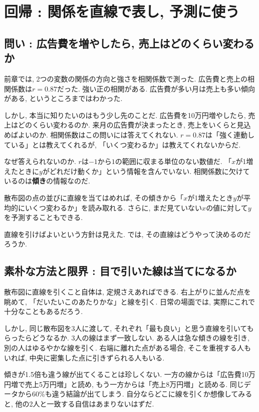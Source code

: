 ﻿\section{回帰 : 関係を直線で表し, 予測に使う}

\subsection{問い : 広告費を増やしたら, 売上はどのくらい変わるか}

前章では, 2つの変数の関係の方向と強さを相関係数で測った.
広告費と売上の相関係数は$r = 0.87$だった.
強い正の相関がある. 広告費が多い月は売上も多い傾向がある, というところまではわかった.

しかし, 本当に知りたいのはもう少し先のことだ.
広告費を10万円増やしたら, 売上はどのくらい変わるのか.
来月の広告費が決まったとき, 売上をいくらと見込めばよいのか.
相関係数はこの問いには答えてくれない.
$r = 0.87$は「強く連動している」とは教えてくれるが, 「いくつ変わるか」は教えてくれないからだ.

なぜ答えられないのか.
$r$は$-1$から$1$の範囲に収まる単位のない数値だ.
「$x$が1増えたときに$y$がどれだけ動くか」という情報を含んでいない.
相関係数に欠けているのは\textbf{傾き}の情報なのだ.

散布図の点の並びに直線を当てはめれば, その傾きから「$x$が1増えたとき$y$が平均的にいくつ変わるか」を読み取れる.
さらに, まだ見ていない$x$の値に対して$y$を予測することもできる.

直線を引けばよいという方針は見えた.
では, その直線はどうやって決めるのだろうか.


\subsection{素朴な方法と限界 : 目で引いた線は当てになるか}

散布図に直線を引くこと自体は, 定規さえあればできる.
右上がりに並んだ点を眺めて, 「だいたいこのあたりかな」と線を引く.
日常の場面では, 実際にこれで十分なこともあるだろう.

しかし, 同じ散布図を3人に渡して, それぞれ「最も良い」と思う直線を引いてもらったらどうなるか.
3人の線はまず一致しない.
ある人は急な傾きの線を引き, 別の人はゆるやかな線を引く.
右端に離れた点がある場合, そこを重視する人もいれば, 中央に密集した点に引きずられる人もいる.

傾きが1.5倍も違う線が出てくることは珍しくない.
一方の線からは「広告費10万円増で売上5万円増」と読め, もう一方からは「売上8万円増」と読める.
同じデータから60\%も違う結論が出てしまう.
自分ならどこに線を引くか想像してみると, 他の2人と一致する自信はあまりないはずだ.

